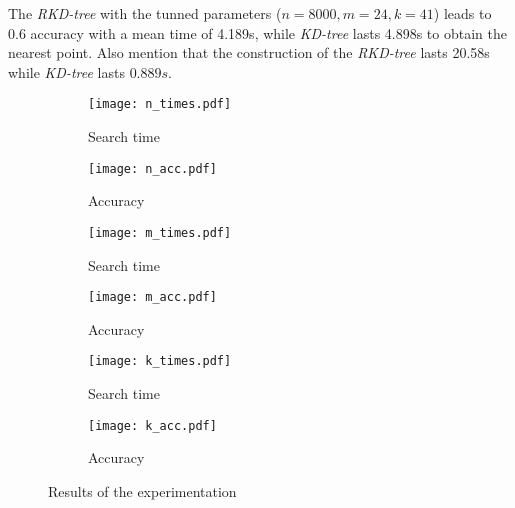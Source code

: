The \textit{RKD-tree} with the tunned parameters ($n = 8000, m = 24, k = 41$) leads to 0.6 accuracy with a mean time of 4.189s, while \textit{KD-tree} lasts 4.898s to obtain the nearest point. Also mention that the construction of the \textit{RKD-tree} lasts 20.58s while \textit{KD-tree} lasts $0.889s$.

\begin{figure*}[hbtp]
    \begin{subfigure}[b]{0.45\textwidth}
          \texttt{[image: n\_times.pdf]}
          \caption{Search time}
          \label{fig:n_times}
    \end{subfigure}
    \hspace{0.05\textwidth}
    \begin{subfigure}[b]{0.45\textwidth}
          \texttt{[image: n\_acc.pdf]}
          \caption{Accuracy}
          \label{fig:n_acc}
    \end{subfigure}
    \begin{subfigure}[b]{0.45\textwidth}
          \texttt{[image: m\_times.pdf]}
          \caption{Search time}
          \label{fig:m_times}
    \end{subfigure}
    \hspace{0.05\textwidth}
    \begin{subfigure}[b]{0.45\textwidth}
          \texttt{[image: m\_acc.pdf]}
          \caption{Accuracy}
          \label{fig:m_acc}
    \end{subfigure}
    \begin{subfigure}[b]{0.45\textwidth}
          \texttt{[image: k\_times.pdf]}
          \caption{Search time}
          \label{fig:hv_times}
    \end{subfigure}
    \hspace{0.05\textwidth}
    \begin{subfigure}[b]{0.45\textwidth}
          \texttt{[image: k\_acc.pdf]}
          \caption{Accuracy}
          \label{fig:hv_acc}
    \end{subfigure}
    \caption{Results of the experimentation}
    \label{fig:experiment}
\end{figure*}


